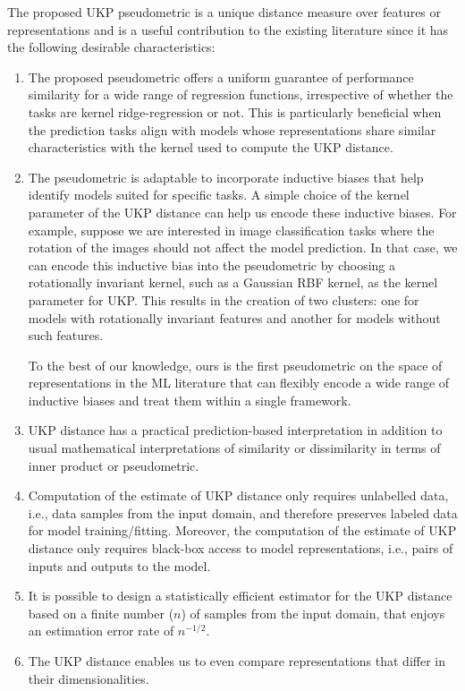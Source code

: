 \documentclass[11pt]{article}
\newcommand{\metricstname}{UKP }
\theoremstyle{plain}
\begin{document}
 The proposed \metricstname pseudometric is a unique distance measure over features or representations and is a useful contribution to the existing literature since it has the following desirable characteristics:
\begin{enumerate}
    
     \item The proposed pseudometric offers a uniform guarantee of performance similarity for a wide range of regression functions, irrespective of whether the tasks are kernel ridge-regression or not. This is particularly beneficial when the prediction tasks align with models whose representations share similar characteristics with the kernel used to compute the \metricstname distance.

     \item The pseudometric is adaptable to incorporate inductive biases that help identify models suited for specific tasks. A simple choice of the kernel parameter of the \metricstname distance can help us encode these inductive biases. For example, suppose we are interested in image classification tasks where the rotation of the images should not affect the model prediction. In that case, we can encode this inductive bias into the pseudometric by choosing a rotationally invariant kernel, such as a Gaussian RBF kernel, as the kernel parameter for UKP. This results in the creation of two clusters: one for models with rotationally invariant features and another for models without such features.
    
    To the best of our knowledge, ours is the first pseudometric on the space of representations in the ML literature that can flexibly encode a wide range of inductive biases and treat them within a single framework.

    \item \metricstname distance has a practical prediction-based interpretation in addition to usual mathematical interpretations of similarity or dissimilarity in terms of inner product or pseudometric.
    
    \item Computation of the estimate of \metricstname distance only requires unlabelled data, i.e., data samples from the input domain, and therefore preserves labeled data for model training/fitting. Moreover, the computation of the estimate of \metricstname distance only requires black-box access to model representations, i.e., pairs of inputs and outputs to the model. 
    \item It is possible to design a statistically efficient estimator for the \metricstname distance based on a finite number ($n$) of samples from the input domain, that enjoys an estimation error rate of $n^{-1/2}$.
    
    \item The \metricstname distance enables us to even compare representations that differ in their dimensionalities. 
    
\end{enumerate}
\end{document}
